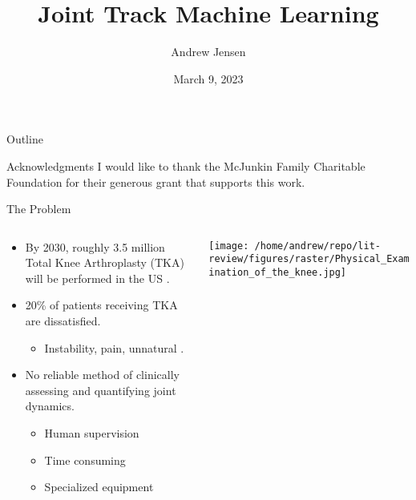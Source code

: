 \documentclass[presentation, aspectratio=1610]{beamer}
\author{Andrew Jensen}
\date{March 9, 2023}
\title{Joint Track Machine Learning}
\begin{document}
\maketitle
\begin{frame}{Outline}
\tableofcontents
\end{frame}


\begin{frame}[label={sec:org06e3603},standout]{Acknowledgments}
I would like to thank the McJunkin Family Charitable Foundation for their generous grant that supports this work.
\end{frame}

\begin{frame}[label={sec:org89e4787}]{The Problem}
\begin{columns}
\begin{column}{0.5\columnwidth}
\begin{itemize}
\item By 2030, roughly 3.5 million Total Knee Arthroplasty (TKA) will be performed in the US \autocite{kurtzProjectionsPrimaryRevision2007}.
\item 20\% of patients receiving TKA are dissatisfied.
\begin{itemize}
\item Instability, pain, unnatural \autocites{bakerRolePainFunction2007}[][]{bournePatientSatisfactionTotal2010}[][]{scottPredictingDissatisfactionFollowing2010}.
\end{itemize}
\item No reliable method of clinically assessing and quantifying joint dynamics.
\begin{itemize}
\item Human supervision
\item Time consuming
\item Specialized equipment
\end{itemize}
\end{itemize}
\end{column}
\begin{column}{0.5\columnwidth}
\begin{center}
\texttt{[image: /home/andrew/repo/lit-review/figures/raster/Physical\_Examination\_of\_the\_knee.jpg]}
\end{center}
\end{column}
\end{columns}
\end{frame}
\end{document}
